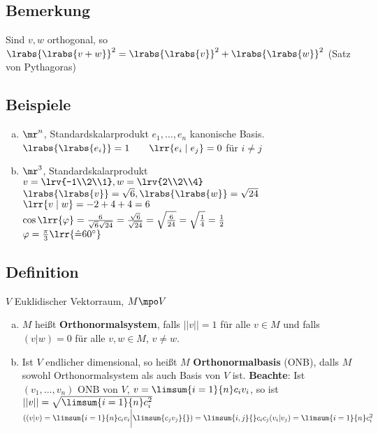 \subsection{Bemerkung}
	Sind $v,w$ orthogonal, so $\lrabs{\lrabs{v+w}}^2=\lrabs{\lrabs{v}}^2+\lrabs{\lrabs{w}}^2$ (Satz von Pythagoras)

\subsection{Beispiele}
    \begin{enumerate}[a)]
	\item $\mr^n$, Standardskalarprodukt $e_1,\dots,e_n$ kanonische Basis.\\
		$\lrabs{\lrabs{e_i}}=1\qquad\lrr{e_i\mid e_j}=0$ für $i\neq j$
	\item $\mr^3$, Standardskalarprodukt\\
		$v=\lrv{-1\\2\\1}, w=\lrv{2\\2\\4}$\\
		$\lrabs{\lrabs{v}}=\sqrt{6},\lrabs{\lrabs{w}}=\sqrt{24}$\\
		$\lrr{v\mid w}=-2+4+4=6$\\
		$\cos\lrr{\varphi}=\frac{6}{\sqrt{6}\sqrt{24}}=\frac{\sqrt{6}}{\sqrt{24}}=\sqrt{\frac{6}{24}}=\sqrt{\frac{1}{4}}=\frac{1}{2}$\\
		$\varphi=\frac{\pi}{3}\lrr{\hat{=}60^\circ}$
    \end{enumerate}
\subsection{Definition}
	$ V $ Euklidischer Vektorraum, $ M\mpo V $
	\begin{enumerate}[a)]
		\item $ M $ heißt \textbf{Orthonormalsystem}, falls $ ||v||=1 $ für alle $ v\in M $ und falls $ (v|w)=0 $ für alle $ v,w\in M $, $ v\neq w $.
		\item Ist $ V $ endlicher dimensional, so heißt $ M $ \textbf{Orthonormalbasis} (ONB), dalls $ M $ sowohl Orthonormalsystem als auch Basis von $ V $ ist.
      \textbf{Beachte}: Ist $ (v_1,...,v_n) $ ONB von $ V $, $ v=\limsum{i=1}{n}c_iv_i $, so ist $ ||v||=\sqrt{\limsum{i=1}{n}c_i^2} $\\
      $ ((v|v)=\limsum{i=1}{n}c_iv_i\bigg|\limsum{c_jv_j}{})=\limsum{i,j}{}c_ic_j(v_i|v_j)=\limsum{i=1}{n}c_i^2 $
	\end{enumerate}
